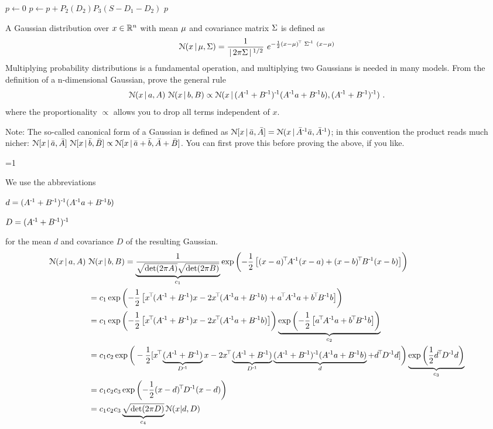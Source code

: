 \begin{algorithm}
	\begin{algorithmic}
		\State $p\gets 0$
		\State $p\gets p + P_2(D_2)P_3(S - D_1 - D_2)$
		\EndFor
		\State \Return $p$
		\EndFunction
	\end{algorithmic}
\end{algorithm}



A Gaussian distribution over $x\in\RRR^n$ with mean $\m$ and covariance matrix
$\S$ is defined as
$$\NN(x \| \m,\S) = \frac{1}{\|2\pi \S\|^{1/2}}~ e^{-\half
	(x-\m)^\T~ \S^\1~ (x-\m)}$$
Multiplying probability distributions is a
fundamental operation, and multiplying two Gaussians is needed in many
models. From the definition of a n-dimensional Gaussian, prove the general rule
$$
\NN(x \| a,A)~ \NN(x \| b,B) 
\propto \NN(x \| (A^\1+B^\1)^\1 (A^\1 a + B^\1 b) ,(A^\1+B^\1)^\1) ~.
$$
where the proportionality $\propto$ allows you to drop all terms independent of $x$.

Note: The so-called canonical form of a Gaussian is defined as
$\NN[x \| \bar a,\bar A] = \NN(x \| \bar A^\1 \bar a, \bar A^\1)$; in
this convention the product reads much nicher: $\NN[x \| \bar a,\bar
A]~ \NN[x \| \bar b,\bar B] \propto \NN[x \| \bar a+\bar b,\bar A+\bar
B]$. You can first prove this before proving the above, if you like.

\ifnum\value{solutions}=1
\begin{solution}
	We use the abbreviations 
	
	$d = (A^\1+B^\1)^\1 (A^\1 a + B^\1 b)$
	
	$D = (A^\1+B^\1)^\1$
	
	for the mean $d$ and covariance 
	$D$ of the resulting Gaussian.
	\begin{align*}
		\NN(x \| a,A)~ &\NN(x \| b,B)  = \underbrace{\frac{1}{\sqrt{\det(2\pi 
					A)}\sqrt{\det(2\pi B)}}}_{c_1} \exp\left(-\frac{1}{2}\left[(x-a)^\T 
		A^\1 
		(x-a)+(x-b)^\T B^\1 
		(x-b)\right]\right) \\
		&=c_1 \exp\left(-\frac{1}{2}\left[x^\T 
		(A^\1 +B^\1)x -2x^\T (A^\1a+B^\1b) +a^\T A^\1 a + b^\T B^\1 
		b\right]\right)\\
		&=c_1 \exp\left(-\frac{1}{2}\left[x^\T 
		(A^\1 +B^\1)x -2x^\T (A^\1a+B^\1b)\right]\right) 
		\underbrace{\exp\left( 
			-\frac{1}{2}\left[ a^\T A^\1 
			a + b^\T B^\1b \right]\right)}_{c_2} \\
		&=c_1 c_2 \exp\bigg(-\frac{1}{2}[x^\T 
		\underbrace{(A^\1 +B^\1)}_{D^\1} x -2x^\T \underbrace{(A^\1 
			+B^\1)}_{D^\1} \underbrace{(A^\1 
			+B^\1)^\1(A^\1a+B^\1b)}_{d} +d^\T D^\1d]\bigg) 
		\underbrace{\exp\left( 
			\frac{1}{2}d^\T D^\1d\right)}_{c_3} \\
		&=c_1 c_2 c_3 \exp\left(-\frac{1}{2}(x-d)^\T 
		D^\1(x-d)\right)\\
		&=c_1 c_2 c_3 \underbrace{\sqrt{\det(2\pi D)}}_{c_4} \NN(x|d,D)
	\end{align*}
\end{solution}
\fi


